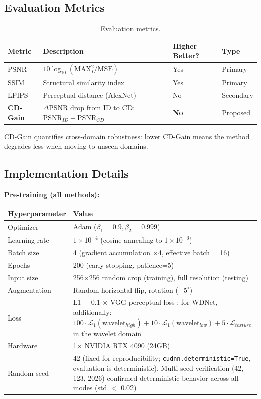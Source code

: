 \documentclass[10pt,twocolumn,letterpaper]{article}
\begin{document}
\subsection{Evaluation Metrics}

\begin{table}[tbp]
\centering
\footnotesize
\caption{Evaluation metrics.}
\label{tab:metrics}
\setlength{\tabcolsep}{3pt}
\begin{tabular}{@{}p{1.3cm}p{3.4cm}p{1.5cm}p{1.2cm}@{}}
\toprule
Metric & Description & Higher Better? & Type \\
\midrule
PSNR & $10 \log_{10}(\text{MAX}_I^2 / \text{MSE})$ & Yes & Primary \\
SSIM & Structural similarity index & Yes & Primary \\
LPIPS & Perceptual distance (AlexNet) & No & Secondary \\
\textbf{CD-Gain} & $\Delta$PSNR drop from ID to CD: $\text{PSNR}_{ID} - \text{PSNR}_{CD}$ & \textbf{No} & Proposed \\
\bottomrule
\end{tabular}
\end{table}

CD-Gain quantifies cross-domain robustness: lower CD-Gain means the method degrades less when moving to unseen domains.

\subsection{Implementation Details}

\textbf{Pre-training (all methods):}
\begin{center}
\footnotesize
\begin{tabular}{@{}lp{5.5cm}@{}}
\toprule
Hyperparameter & Value \\
\midrule
Optimizer & Adam ($\beta_1 = 0.9, \beta_2 = 0.999$) \\
Learning rate & $1 \times 10^{-4}$ (cosine annealing to $1 \times 10^{-6}$) \\
Batch size & 4 (gradient accumulation $\times$4, effective batch = 16) \\
Epochs & 200 (early stopping, patience=5) \\
Input size & 256$\times$256 random crop (training), full resolution (testing) \\
Augmentation & Random horizontal flip, rotation ($\pm 5^\circ$) \\
Loss & L1 + 0.1 $\times$ VGG perceptual loss \cite{simonyan2014very}; for WDNet, additionally: $100\cdot\mathcal{L}_1(\text{wavelet}_{high}) + 10\cdot\mathcal{L}_1(\text{wavelet}_{low}) + 5\cdot\mathcal{L}_{texture}$ in the wavelet domain \\
Hardware & 1$\times$ NVIDIA RTX 4090 (24GB) \\
Random seed & 42 (fixed for reproducibility; \texttt{cudnn.deterministic=True}, evaluation is deterministic). Multi-seed verification (42, 123, 2026) confirmed deterministic behavior across all modes (std $<$ 0.02) \\
\bottomrule
\end{tabular}
\end{center}
\end{document}
